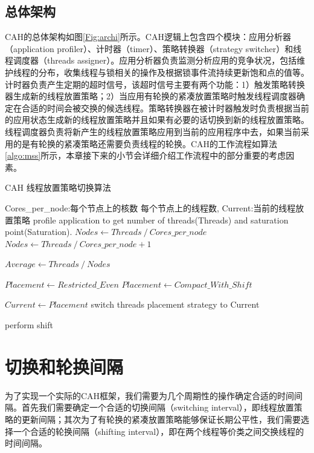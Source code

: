 \subsection{总体架构}
CAH的总体架构如图\ref{Fig:archi}所示。CAH逻辑上包含四个模块：应用分析器（application profiler）、计时器（timer）、策略转换器（strategy switcher）和线程调度器（threads assigner）。应用分析器负责监测分析应用的竞争状况，包括维护线程的分布，收集线程与锁相关的操作及根据锁事件流持续更新饱和点的值等。计时器负责产生定期的超时信号，该超时信号主要有两个功能：1）触发策略转换器生成新的线程放置策略；2）当应用有轮换的紧凑放置策略时触发线程调度器确定在合适的时间会被交换的候选线程。策略转换器在被计时器触发时负责根据当前的应用状态生成新的线程放置策略并且如果有必要的话切换到新的线程放置策略。线程调度器负责将新产生的线程放置策略应用到当前的应用程序中去，如果当前采用的是有轮换的紧凑策略还需要负责线程的轮换。CAH的工作流程如算法\ref{algo:mss}所示，本章接下来的小节会详细介绍工作流程中的部分重要的考虑因素。

\begin{algorithm}
\caption{CAH 线程放置策略切换算法}
\label{algo:mss}
\begin{algorithmic}[1] %
\Require Cores\_per\_node:每个节点上的核数 每个节点上的线程数, Current:当前的线程放置策略 %
\Repeat
{}
\State profile application to get number of threads(Threads) and saturation point(Saturation).
    \State $Nodes \gets Threads\  / \ Cores\_per\_node$
\Else
    \State $Nodes \gets Threads\  / \ Cores\_per\_node + 1$
\EndIf

\State $Average \gets Threads\  / \ Nodes$

    \State $Placement \gets Restricted\_Even$
\Else
    \State $Placement \gets Compact\_With\_Shift$
\EndIf

    \State $Current \gets Placement$
    \State switch threads placement strategy to Current 
\EndIf

    \State perform shift
\EndIf

\end{algorithmic}
\end{algorithm}

\section{切换和轮换间隔}
为了实现一个实际的CAH框架，我们需要为几个周期性的操作确定合适的时间间隔。首先我们需要确定一个合适的切换间隔（switching interval），即线程放置策略的更新间隔；其次为了有轮换的紧凑放置策略能够保证长期公平性，我们需要选择一个合适的轮换间隔（shifting interval），即在两个线程等价类之间交换线程的时间间隔。

